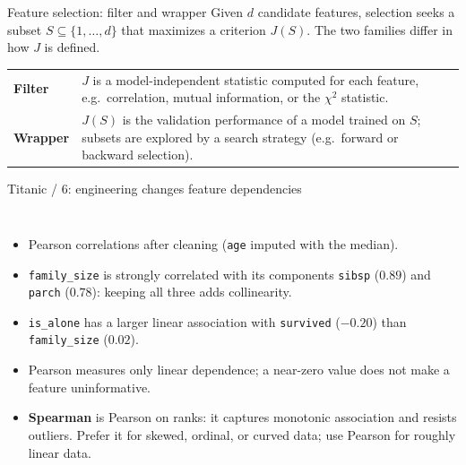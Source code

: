 \begin{frame}{Feature selection: filter and wrapper}
\begingroup\small
Given $d$ candidate features, selection seeks a subset $S \subseteq \{1, \dots, d\}$ that maximizes a criterion $J(S)$. The two families differ in how $J$ is defined.
\par\endgroup
\vspace{0.5em}
\begin{tabularx}{\textwidth}{>{\bfseries}l X}
Filter & $J$ is a model-independent statistic computed for each feature, e.g.\ correlation, mutual information, or the $\chi^2$ statistic. \\
\addlinespace[0.3em]
Wrapper & $J(S)$ is the validation performance of a model trained on $S$; subsets are explored by a search strategy (e.g.\ forward or backward selection). \\
\bottomrule
\end{tabularx}
\coursefooter
\end{frame}
\begin{frame}{Titanic / 6: engineering changes feature dependencies}
\begin{columns}[T]
\centering
{}
\begin{itemize}\footnotesize
\item Pearson correlations after cleaning (\texttt{age} imputed with the median).
\item \texttt{family\_size} is strongly correlated with its components \texttt{sibsp} ($0.89$) and \texttt{parch} ($0.78$): keeping all three adds collinearity.
\item \texttt{is\_alone} has a larger linear association with \texttt{survived} ($-0.20$) than \texttt{family\_size} ($0.02$).
\item Pearson measures only linear dependence; a near-zero value does not make a feature uninformative.
\item \textbf{Spearman} is Pearson on ranks: it captures monotonic association and resists outliers. Prefer it for skewed, ordinal, or curved data; use Pearson for roughly linear data.
\end{itemize}
\end{columns}
\coursefooter
\end{frame}
